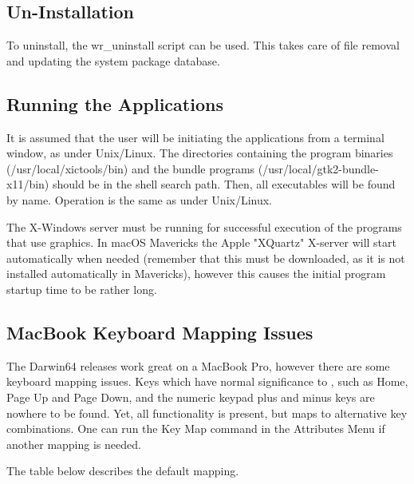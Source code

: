 \begin{itemize}
\subsection{Un-Installation}

To uninstall, the {\vt wr\_uninstall} script can be used.  This takes
care of file removal and updating the system package database.

\subsection{Running the Applications}

It is assumed that the user will be initiating the applications from a
terminal window, as under Unix/Linux.  The directories containing the
program binaries ({\vt /usr/local/xictools/bin}) and the bundle
programs ({\vt /usr/local/gtk2-bundle-x11/bin}) should be in the
shell search path.  Then, all executables will be found by name. 
Operation is the same as under Unix/Linux.

The X-Windows server must be running for successful execution of the
programs that use graphics.  In macOS Mavericks the Apple "XQuartz"
X-server will start automatically when needed (remember that this must
be downloaded, as it is not installed automatically in Mavericks),
however this causes the initial program startup time to be rather
long.

\subsection{MacBook Keyboard Mapping Issues}

The Darwin64 releases work great on a MacBook Pro, however there are
some keyboard mapping issues.  Keys which have normal significance to
{\Xic}, such as {\kb Home}, {\kb Page Up} and {\kb Page Down}, and the
numeric keypad plus and minus keys are nowhere to be found.  Yet, all
functionality is present, but maps to alternative key combinations. 
One can run the {\cb Key Map} command in the {\cb Attributes Menu} if
another mapping is needed.

The table below describes the default mapping.


\end{itemize}
